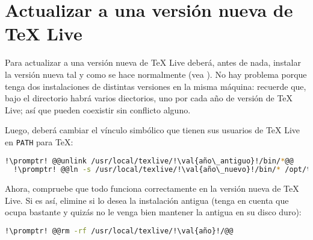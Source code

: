 \section{Actualizar a una versión nueva de \TeX{} Live}\label{sec:tex-upgrade}
Para actualizar a una versión nueva de \TeX{} Live deberá, antes de nada, instalar la versión nueva tal y como
se hace normalmente (vea ). No hay problema porque tenga dos instalaciones de distintas
versiones en la misma máquina: recuerde que, bajo el directorio  habrá varios
diectorios, uno por cada año de versión de \TeX{} Live; así que pueden coexistir sin conflicto alguno.

Luego, deberá cambiar el vínculo simbólico que tienen sus usuarios de \TeX{} Live en \lstinline+PATH+ para
\TeX{}:

\begin{lstlisting}[gobble=2,language=bash,style=bashinteract,escapechar=!]
  !\promptr! @@unlink /usr/local/texlive/!\val{año\_antiguo}!/bin/*@@
  !\promptr! @@ln -s /usr/local/texlive/!\val{año\_nuevo}!/bin/* /opt/texbin@@
\end{lstlisting}

Ahora, compruebe que todo funciona correctamente en la versión nueva de \TeX{} Live. Si es así, elimine si lo
desea la instalación antigua (tenga en cuenta que ocupa bastante y quizás no le venga bien mantener la antigua
en su disco duro):

\begin{lstlisting}[gobble=2,language=bash,style=bashinteract,escapechar=!]
  !\promptr! @@rm -rf /usr/local/texlive/!\val{año}!/@@
\end{lstlisting}
